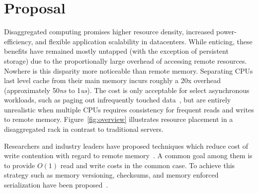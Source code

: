 \section{Proposal}
\label{sec:intro}

Disaggregated computing promises higher resource density, increased
power-efficiency, and flexible application scalability in datacenters.
While enticing, these benefits have remained mostly untapped (with the
exception of persistent storage) due to the proportionally large
overhead of accessing remote resources. Nowhere is this disparity more
noticeable than remote memory. Separating CPUs last level cache from
their main memory incurs roughly a 20x overhead (approximately
50\textit{ns} to 1\textit{us}).  The cost is only acceptable for
select asynchronous workloads, such as paging out infrequently touched
data~\cite{gms}, but are entirely unrealistic when multiple CPUs
requires consistency for frequent reads and writes to remote memory.
Figure~\ref{fig:overview} illustrates resource placement in a
disaggregated rack in contrast to traditional servers.

Researchers and industry leaders have proposed techniques which reduce
cost of write contention with regard to remote
memory~\cite{aguilera2019designing,cell,sonuma,storm,clover}. A common
goal among them is to provide $O(1)$ read and write costs in the
common case. To achieve this strategy such as memory versioning,
checksums, and memory enforced serialization have been
proposed~\cite{aguilera2019designing}.


